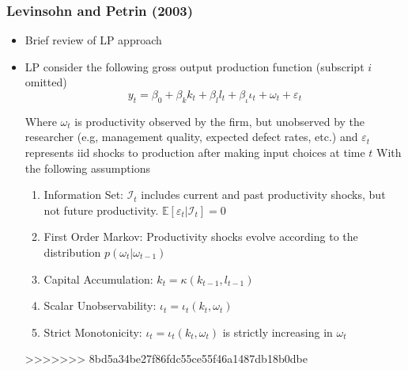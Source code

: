 \documentclass{beamer}
\begin{document}
\begin{frame}
\frametitle{Levinsohn and Petrin (2003)}
\begin{itemize}
	\item Brief review of LP approach
	
	\item LP consider the following gross output production function (subscript $i$ omitted)
	\begin{equation}
	y_{t}=\beta_{0}+\beta_{k}k_{t}+\beta_{l}l_{t}+\beta_{\iota}\iota_{t}+\omega_{t}+\varepsilon_{t}
	\end{equation}
	
	Where $\omega_{t}$ is productivity observed by the firm, but unobserved by the researcher (e.g, management quality, expected defect rates, etc.) and $\varepsilon_{t}$ represents iid shocks to production after making input choices at time $t$
	With the following assumptions
	\medskip
	\begin{enumerate}
		
		\item Information Set: $\mathcal{I}_{t}$ includes current and past productivity shocks, but not future productivity. $\mathbb{E}[\varepsilon_{t}|\mathcal{I}_{t}]=0$
		\item First Order Markov: Productivity shocks evolve according to the distribution $p(\omega_{t}|\omega_{t-1})$
		\item Capital Accumulation: $k_{t}=\kappa(k_{t-1}, l_{t-1})$
		\item Scalar Unobservability: $\iota_{t}=\iota_{t}(k_{t}, \omega_{t})$
		\item Strict Monotonicity: $\iota_{t}=\iota_{t}(k_{t}, \omega_{t})$ is strictly increasing in $\omega_{t}$
	\end{enumerate}
>>>>>>> 8bd5a34be27f86fdc55ce55f46a1487db18b0dbe
\end{itemize}
\end{frame}
\end{document}
